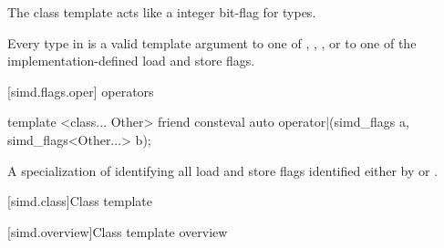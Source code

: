 \pnum
The class template  acts like a integer bit-flag for types.

\pnum\constraints
Every type in  is a valid template argument to one of
, ,
, or to one of the implementation-defined load and
store flags.

[simd.flags.oper]{ operators}

\begin{itemdecl}
template <class... Other>
  friend consteval auto operator|(simd_flags a, simd_flags<Other...> b);
\end{itemdecl}

\begin{itemdescr}
  \pnum\returns
  A specialization of  identifying all load and
  store flags identified either by  or .
\end{itemdescr}

[simd.class]{Class template }

[simd.overview]{Class template  overview}

